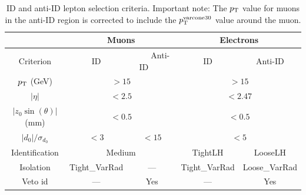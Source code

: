 \begin{table}[htb]
\vspace{0.4cm}
\centering
\begin{tabular}{c||c|c|c|c}
  \hline
                           & \multicolumn{2}{c|}{Muons}    & \multicolumn{2}{c}{Electrons}   \\
  \hline
  Criterion                 & ID                            & ~~~~Anti-ID~~~~        & ID     & Anti-ID    \\
  \hline
  $p_{\mathrm{T}}$ (GeV)              & \multicolumn{2}{c|}{$> 15$}   & \multicolumn{2}{c}{$> 15$}        \\
  $|\eta|$                 & \multicolumn{2}{c|}{$< 2.5$}  & \multicolumn{2}{c}{$< 2.47$}      \\
  $|z_0\sin(\theta)|$ (mm) & \multicolumn{2}{c|}{$< 0.5$}  & \multicolumn{2}{c}{$< 0.5$}       \\
  $|d_0|/\sigma_{d_0}$     & $< 3$                         & $< 15$         & \multicolumn{2}{c}{$< 5$}        \\
  Identification           & \multicolumn{2}{c|}{Medium}   & {TightLH}      & {LooseLH}        \\
  Isolation                & {Tight\_VarRad}               & {---}          & {Tight\_VarRad}   &  {Loose\_VarRad} \\
  Veto id                  & ---                           & Yes            & ---               & Yes          \\
  \end{tabular}
  \caption{ID and anti-ID lepton selection criteria. Important note: The $p_{\mathrm{T}}$ value for muons in the anti-ID region is corrected to include the $p_{\mathrm{T}}^{\text{varcone30}}$ value around the muon.}\label{tab:wh_id_antiid_selection}
\end{table}